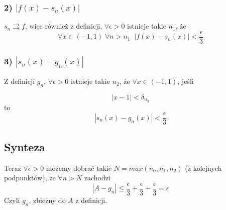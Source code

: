 \documentclass{article}
\begin{document}
\subsubsection*{2) $|f(x)-s_n(x)|$}
$s_n \rightrightarrows f$, więc również z definicji, $\forall \epsilon >0$ istnieje takie $n_1$, że
$$\forall x \in (-1, 1) \; \forall n > n_1 \;\; |f(x)-s_n(x)| < \frac{\epsilon}{3}$$
\subsubsection*{3) $|s_n(x) - g_n(x)|$}
Z definicji $g_n$, $\forall \epsilon > 0$ istnieje takie $n_2$, że $\forall x\in (-1,1)$, jeśli

$$|x-1| < \delta_{n_3}$$
to 
$$|s_n(x)-g_n(x)| < \frac{\epsilon}{3}$$

\subsection*{Synteza}
Teraz $\forall \epsilon > 0$ możemy dobrać takie $N = max(n_0, n_1, n_2)$ (z kolejnych podpunktów), że $\forall n>N$ zachodzi
$$|A-g_n| \le \frac{\epsilon}{3} + \frac{\epsilon}{3} + \frac{\epsilon}{3} = \epsilon $$
Czyli $g_n$, zbieżny do $A$ z definicji.
\end{document}
